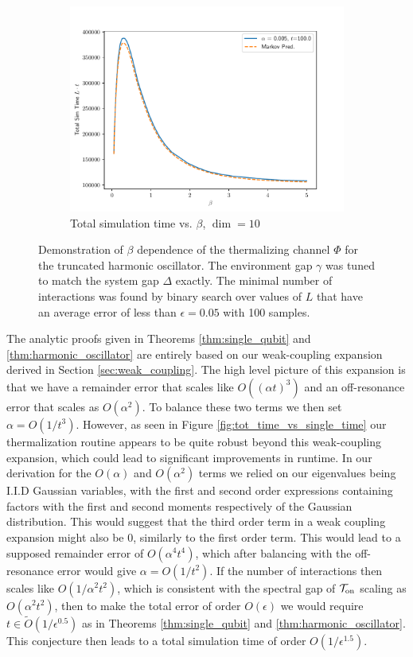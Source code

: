 \documentclass[
 amsmath,amssymb,
 aps,
onecolumn, 
nofootinbib]{revtex4-2}
\newcommand{\on}{\rm on}
\newcommand{\TT}{\mathcal{T}}
\newcommand{\bigo}[1]{O\left(#1\right)}
\newcommand{\bigotilde}[1]{\widetilde{O} \left( #1 \right)}
\begin{document}
\begin{figure}[t]
\begin{subfigure}{0.5\textwidth}
    \includegraphics[width=\textwidth]{numerics/data/sho_total_time_vs_beta_dim_10.pdf}
    \caption{Total simulation time vs. $\beta$, $\dim = 10$}
    \label{fig:sho_l_vs_beta_dim_10}
    \end{subfigure}
    \caption{Demonstration of $\beta$ dependence of the thermalizing channel $\Phi$ for the truncated harmonic oscillator. The environment gap $\gamma$ was tuned to match the system gap $\Delta$ exactly. The minimal number of interactions was found by binary search over values of $L$ that have an average error of less than $\epsilon = 0.05$ with 100 samples.}
    \label{fig:sho_total_time_vs_beta}
\end{figure}

The analytic proofs given in Theorems \ref{thm:single_qubit} and \ref{thm:harmonic_oscillator} are entirely based on our weak-coupling expansion derived in Section \ref{sec:weak_coupling}. The high level picture of this expansion is that we have a remainder error that scales like $\bigo{(\alpha t)^3}$ and an off-resonance error that scales as $\bigo{\alpha^2}$. To balance these two terms we then set $\alpha = \bigo{1/t^3}$. However, as seen in Figure \ref{fig:tot_time_vs_single_time} our thermalization routine appears to be quite robust beyond this weak-coupling expansion, which could lead to significant improvements in runtime. In our derivation for the $\bigo{\alpha}$ and $\bigo{\alpha^2}$ terms we relied on our eigenvalues being I.I.D Gaussian variables, with the first and second order expressions containing factors with the first and second moments respectively of the Gaussian distribution. This would suggest that the third order term in a weak coupling expansion might also be 0, similarly to the first order term. This would lead to a supposed remainder error of $\bigo{\alpha^4 t^4}$, which after balancing with the off-resonance error would give $\alpha = \bigo{1/t^2}$. If the number of interactions then scales like $\bigo{1/\alpha^2 t^2}$, which is consistent with the spectral gap of $\TT_{\on}$ scaling as $\bigo{\alpha^2 t^2}$, then to make the total error of order $\bigo{\epsilon}$ we would require $t \in \bigotilde{1/\epsilon^{0.5}}$ as in Theorems \ref{thm:single_qubit} and \ref{thm:harmonic_oscillator}. This conjecture then leads to a total simulation time of order $\bigo{1/\epsilon^{1.5}}$. 
\end{document}
